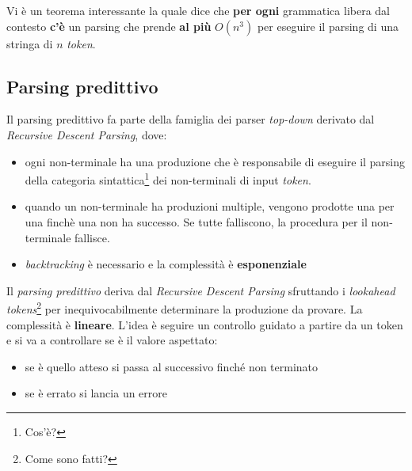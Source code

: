 Vi è un teorema interessante la quale dice che \textbf{per ogni} grammatica
libera dal contesto \textbf{c'è} un parsing che prende \textbf{al più} $O(n^3)$
per eseguire il parsing di una stringa di $n$ \textit{token}.

\subsection{Parsing predittivo}
\label{sec:parsing_predittivo}
Il parsing predittivo fa parte della famiglia dei parser \textit{top-down}
derivato dal \textit{Recursive Descent Parsing}, dove:
\begin{itemize}
\item ogni non-terminale ha una produzione che è responsabile di eseguire il
parsing della categoria sintattica\footnote{Cos'è?} dei non-terminali di input
\textit{token}.
\item quando un non-terminale ha produzioni multiple, vengono prodotte una per
una finchè una non ha successo. Se tutte falliscono, la procedura per il
non-terminale fallisce.
\item \textit{backtracking} è necessario e la complessità è
\textbf{esponenziale}
\end{itemize}

Il \textit{parsing predittivo} deriva dal \textit{Recursive Descent Parsing}
sfruttando i \textit{lookahead tokens}\footnote{Come sono fatti?} per
inequivocabilmente determinare la produzione da provare. La complessità è
\textbf{lineare}. L'idea è seguire un controllo guidato a partire da un token
e si va a controllare se è il valore aspettato:
\begin{itemize}
\item se è quello atteso si passa al successivo finché non terminato
\item se è errato si lancia un errore
\end{itemize}

